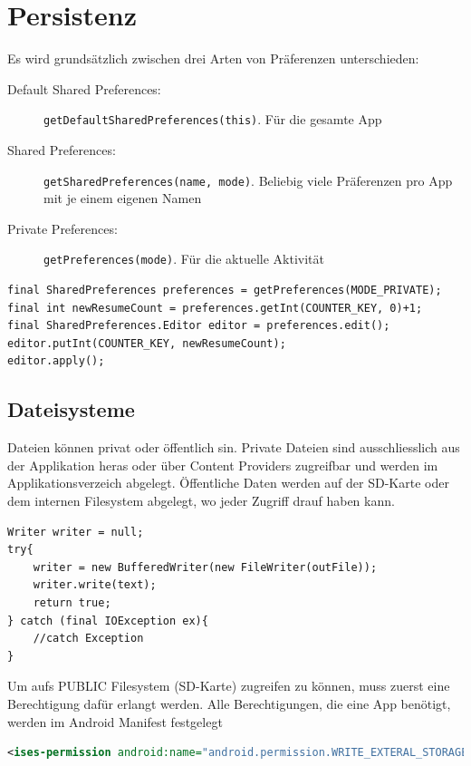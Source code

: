 \documentclass[a4paper, 11pt]{article}
\newcommand{\code}[1]{\texttt{#1}}
\begin{document}
\section{Persistenz}
Es wird grundsätzlich zwischen drei Arten von Präferenzen unterschieden:

\begin{description}
	\item[Default Shared Preferences: ] \code{getDefaultSharedPreferences(this)}. Für die gesamte App
	\item[Shared Preferences: ] \code{getSharedPreferences(name, mode)}. Beliebig viele Präferenzen pro App mit je einem eigenen Namen
	\item[Private Preferences: ] \code{getPreferences(mode)}. Für die aktuelle Aktivität
\end{description}

\begin{lstlisting}[caption={Holen des ResumeCount und um eins erhöht wieder abspeichern}]
final SharedPreferences preferences = getPreferences(MODE_PRIVATE);
final int newResumeCount = preferences.getInt(COUNTER_KEY, 0)+1;
final SharedPreferences.Editor editor = preferences.edit();
editor.putInt(COUNTER_KEY, newResumeCount);
editor.apply();
\end{lstlisting}

\subsection{Dateisysteme}
Dateien können privat oder öffentlich sin. Private Dateien sind ausschliesslich aus der Applikation heras oder über Content Providers zugreifbar und werden im Applikationsverzeich abgelegt. Öffentliche Daten werden auf der SD-Karte oder dem internen Filesystem abgelegt, wo jeder Zugriff drauf haben kann.

\begin{lstlisting}[caption={File schreiben}]
Writer writer = null;
try{
	writer = new BufferedWriter(new FileWriter(outFile));
	writer.write(text);
	return true;
} catch (final IOException ex){
	//catch Exception
}
\end{lstlisting}

Um aufs PUBLIC Filesystem (SD-Karte) zugreifen zu können, muss zuerst eine Berechtigung dafür erlangt werden. Alle Berechtigungen, die eine App benötigt, werden im Android Manifest festgelegt

\begin{lstlisting}[language=xml, caption={Berechtigung im Android Manifest für das Lesen vond der SD-Karte}]
<ises-permission android:name="android.permission.WRITE_EXTERAL_STORAGE"/>
\end{lstlisting}
\end{document}
